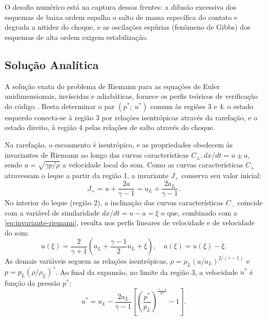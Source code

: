 O desafio numérico está na captura dessas frentes: a difusão excessiva dos esquemas de baixa ordem espalha o salto de massa específica do contato e degrada a nitidez do choque, e as oscilações espúrias (fenômeno de Gibbs) dos esquemas de alta ordem exigem estabilização.


\subsection{Solução Analítica}\label{subsec:solucao-analitica}

A solução exata do problema de Riemann para as equações de Euler unidimensionais, invíscidas e adiabáticas, fornece os perfis teóricos de verificação do código \parencite{Toro2009}.
Resta determinar o par $(p^\ast;\ u^\ast)$ comum às regiões 3 e 4: o estado esquerdo conecta-se à região 3 por relações isentrópicas através da rarefação, e o estado direito, à região 4 pelas relações de salto através do choque.

Na rarefação, o escoamento é isentrópico, e as propriedades obedecem às invariantes de Riemann ao longo das curvas características $C_\pm: dx/dt = u \pm a$, sendo $a = \sqrt{\gamma p / \rho}$ a velocidade local do som.
Como as curvas características $C_+$ atravessam o leque a partir da região 1, a invariante $J_+$ conserva seu valor inicial:
\begin{equation}
    J_+ = u + \frac{2a}{\gamma - 1} = u_L + \frac{2 a_L}{\gamma - 1}. \label{eq:invariante-riemann}
\end{equation}
No interior do leque (região 2), a inclinação das curvas características $C_-$ coincide com a variável de similaridade $dx/dt = u - a = \xi$ o que, combinado com a \eqref{eq:invariante-riemann}, resulta nos perfis lineares de velocidade e de velocidade do som:
\begin{equation}
    u(\xi) = \frac{2}{\gamma+1} \left( a_L + \frac{\gamma-1}{2} u_L + \xi \right), \quad a(\xi) = u(\xi) - \xi.
\end{equation}
As demais variáveis seguem as relações isentrópicas, $\rho = \rho_L (a/a_L)^{2/(\gamma-1)}$ e $p = p_L (\rho/\rho_L)^\gamma$.
Ao final da expansão, no limite da região 3, a velocidade $u^\ast$ é função da pressão $p^\ast$:
\begin{equation}
    u^\ast = u_L - \frac{2 a_L}{\gamma - 1} \left[ \left( \frac{p^\ast}{p_L} \right)^{\frac{\gamma - 1}{2\gamma}} - 1 \right]. \label{eq:rarefacao-analitica}
\end{equation}

